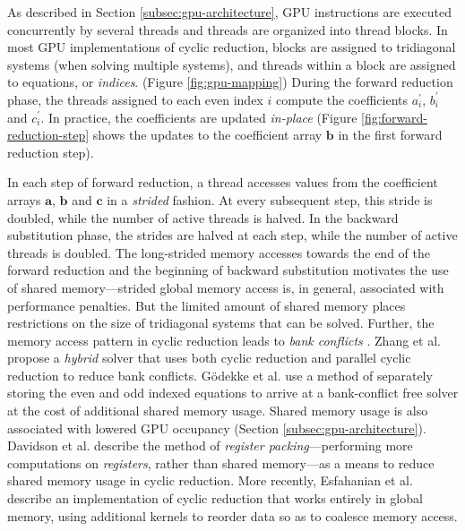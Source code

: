 \documentclass{elsarticle}
\begin{document}
As described in Section \ref{subsec:gpu-architecture},
GPU instructions are executed concurrently
by several threads and
threads are organized into thread blocks.
In most GPU implementations of cyclic reduction,
blocks are assigned to tridiagonal systems
(when solving multiple systems),
and threads within a block 
are assigned to equations, or \emph{indices}.
(Figure \ref{fig:gpu-mapping})
During the forward reduction phase,
the threads assigned to each even index $i$
compute the coefficients
$a_i^\prime$, $b_i^\prime$ and $c_i^\prime$.
In practice, the coefficients are updated \emph{in-place}
(Figure \ref{fig:forward-reduction-step} shows the updates
to the coefficient array $\bm{b}$ in the first forward reduction step).

In each step of forward reduction,
a thread accesses values from the coefficient arrays
$\bm{a}$, $\bm{b}$ and $\bm{c}$ in a \emph{strided} fashion.
At every subsequent step,
this stride is doubled, while the number of active threads is halved.
In the backward substitution phase,
the strides are halved at each step,
while the number of active threads is doubled.
The long-strided memory accesses towards the end
of the forward reduction
and the beginning of backward substitution
motivates the use of shared memory---strided global memory access is,
in general, associated with performance penalties.
But the limited amount of shared memory places restrictions
on the size of tridiagonal systems that can be solved.
Further,
the memory access pattern in
cyclic reduction leads to \emph{bank conflicts}
\cite{Zhang2010FTS}.
Zhang et al. \cite{Zhang2010FTS} propose a
\emph{hybrid} solver
that uses both cyclic reduction and parallel cyclic reduction
to reduce bank conflicts.
G{\"o}dekke et al. \cite{GoSt11CR}
use a method of separately storing
the even and odd indexed equations
to arrive at a bank-conflict free solver
at the cost of additional shared memory usage.
Shared memory usage is also associated with
lowered GPU occupancy (Section \ref{subsec:gpu-architecture}).
Davidson et al. \cite{davidson2011register}
describe the method of
\emph{register packing}---performing more computations
on \emph{registers}, rather than shared memory---as
a means to reduce shared memory usage in cyclic reduction.
More recently, Esfahanian et al. \cite{esfahanian2014efficient}
describe an implementation of cyclic reduction
that works entirely in global memory,
using additional kernels to reorder data so as to
coalesce memory access.

\end{document}
